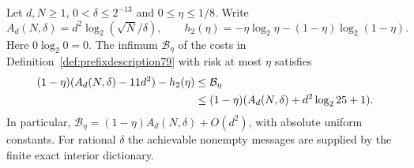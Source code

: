 \begin{theorem}
\label{thm:prefixrate79}
Let $d,N\ge1$, $0<\delta\le2^{-13}$ and $0\le\eta\le1/8$.
Write
\[
 A_d(N,\delta)=d^2\log_2(\sqrt N/\delta),\qquad
 h_2(\eta)=-\eta\log_2\eta-(1-\eta)\log_2(1-\eta).
\]
Here $0\log_2 0=0$.  The infimum $\mathcal B_\eta$ of the costs in
Definition~\ref{def:prefixdescription79} with risk at most $\eta$
satisfies
\begin{align}\label{eq:prefixrate79}
 (1-\eta)(A_d(N,\delta)-11d^2)-h_2(\eta)
 &\le\mathcal B_\eta\\
 &\le(1-\eta)(A_d(N,\delta)+d^2\log_2 25+1).\notag
\end{align}
In particular,
$\mathcal B_\eta=(1-\eta)A_d(N,\delta)+O(d^2)$,
with absolute uniform constants.  For rational $\delta$ the
achievable nonempty messages are supplied by the finite exact
interior dictionary.
\end{theorem}
